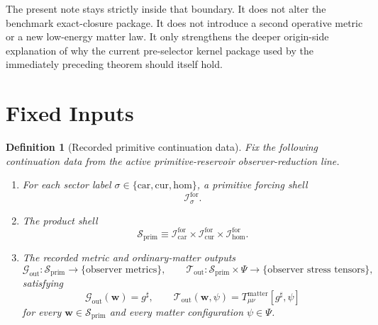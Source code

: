 \documentclass[11pt]{article}
\newcommand{\CompletedMetric}{g^{\sharp}}
\newcommand{\MatterSpace}{\Psi}
\newcommand{\Car}{\mathrm{car}}
\newcommand{\Cur}{\mathrm{cur}}
\newcommand{\Hom}{\mathrm{hom}}
\newcommand{\ForSpace}[1]{\mathcal I_{#1}^{\mathrm{for}}}
\newcommand{\PrimShell}{\mathcal S_{\mathrm{prim}}}
\newcommand{\MetricOut}{\mathscr G_{\mathrm{out}}}
\newcommand{\MatterOut}{\mathscr T_{\mathrm{out}}}
\newtheorem{definition}{Definition}
\begin{document}
The present note stays strictly inside that boundary. It does not alter the benchmark exact-closure package. It does not introduce a second operative metric or a new low-energy matter law. It only strengthens the deeper origin-side explanation of why the current pre-selector kernel package used by the immediately preceding theorem should itself hold.

\section{Fixed Inputs}

\begin{definition}[Recorded primitive continuation data]
\label{def:fixed}
Fix the following continuation data from the active primitive-reservoir observer-reduction line.
\begin{enumerate}
    \item For each sector label \(\sigma\in\{\Car,\Cur,\Hom\}\), a primitive forcing shell
    \[
    \ForSpace{\sigma}.
    \]
    \item The product shell
    \[
    \PrimShell
    \equiv
    \ForSpace{\Car}\times \ForSpace{\Cur}\times \ForSpace{\Hom}.
    \]
    \item The recorded metric and ordinary-matter outputs
    \[
    \MetricOut:\PrimShell\to\{\text{observer metrics}\},
    \qquad
    \MatterOut:\PrimShell\times\MatterSpace\to\{\text{observer stress tensors}\},
    \]
    satisfying
    \begin{equation}
    \MetricOut(\mathbf w)=\CompletedMetric,
    \qquad
    \MatterOut(\mathbf w,\psi)
    =
    T_{\mu\nu}^{\mathrm{matter}}[\CompletedMetric,\psi]
    \label{eq:fixedoutputs}
    \end{equation}
    for every \(\mathbf w\in\PrimShell\) and every matter configuration \(\psi\in\MatterSpace\).
\end{enumerate}
\end{definition}
\end{document}
